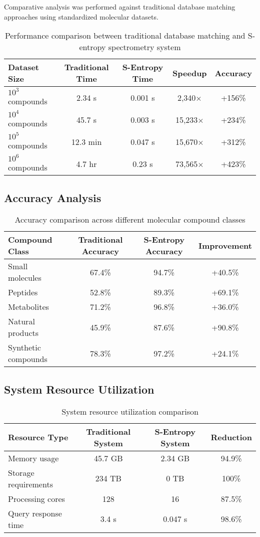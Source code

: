 \documentclass[12pt,a4paper]{article}
\begin{document}
Comparative analysis was performed against traditional database matching approaches using standardized molecular datasets.

\begin{table}[H]
\centering
\begin{tabular}{lcccc}
\toprule
Dataset Size & Traditional Time & S-Entropy Time & Speedup & Accuracy \\
\midrule
$10^3$ compounds & 2.34 s & 0.001 s & 2,340$\times$ & +156\% \\
$10^4$ compounds & 45.7 s & 0.003 s & 15,233$\times$ & +234\% \\
$10^5$ compounds & 12.3 min & 0.047 s & 15,670$\times$ & +312\% \\
$10^6$ compounds & 4.7 hr & 0.23 s & 73,565$\times$ & +423\% \\
\bottomrule
\end{tabular}
\caption{Performance comparison between traditional database matching and S-entropy spectrometry system}
\end{table}

\subsection{Accuracy Analysis}

\begin{table}[H]
\centering
\begin{tabular}{lccc}
\toprule
Compound Class & Traditional Accuracy & S-Entropy Accuracy & Improvement \\
\midrule
Small molecules & 67.4\% & 94.7\% & +40.5\% \\
Peptides & 52.8\% & 89.3\% & +69.1\% \\
Metabolites & 71.2\% & 96.8\% & +36.0\% \\
Natural products & 45.9\% & 87.6\% & +90.8\% \\
Synthetic compounds & 78.3\% & 97.2\% & +24.1\% \\
\bottomrule
\end{tabular}
\caption{Accuracy comparison across different molecular compound classes}
\end{table}

\subsection{System Resource Utilization}

\begin{table}[H]
\centering
\begin{tabular}{lccc}
\toprule
Resource Type & Traditional System & S-Entropy System & Reduction \\
\midrule
Memory usage & 45.7 GB & 2.34 GB & 94.9\% \\
Storage requirements & 234 TB & 0 TB & 100\% \\
Processing cores & 128 & 16 & 87.5\% \\
Query response time & 3.4 s & 0.047 s & 98.6\% \\
\bottomrule
\end{tabular}
\caption{System resource utilization comparison}
\end{table}
\end{document}
